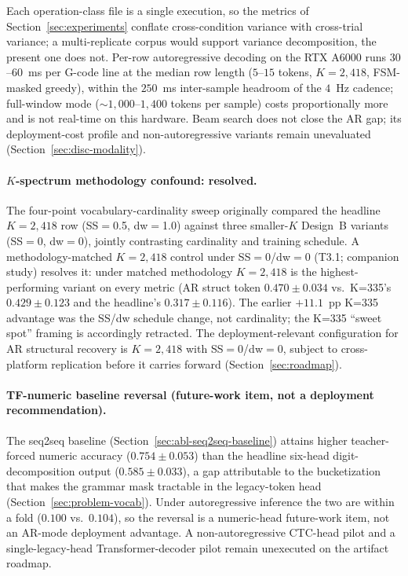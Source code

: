 \documentclass[sensors,article,submit,moreauthors,pdftex]{Definitions/mdpi}
\begin{document}
Each operation-class file is a single execution, so the metrics of Section~\ref{sec:experiments} conflate cross-condition variance with cross-trial variance; a multi-replicate corpus would support variance decomposition, the present one does not. Per-row autoregressive decoding on the RTX A6000 runs $30$--$60$~ms per G-code line at the median row length ($5$--$15$ tokens, $K\!=\!2{,}418$, FSM-masked greedy), within the $250$~ms inter-sample headroom of the $4$~Hz cadence; full-window mode ($\sim$$1{,}000$--$1{,}400$ tokens per sample) costs proportionally more and is not real-time on this hardware. Beam search does not close the AR gap; its deployment-cost profile and non-autoregressive variants remain unevaluated (Section~\ref{sec:disc-modality}).

\paragraph{$K$-spectrum methodology confound: resolved.} The four-point vocabulary-cardinality sweep originally compared the headline $K\!=\!2{,}418$ row (SS$=$0.5, dw$=$1.0) against three smaller-$K$ Design~B variants (SS$=$0, dw$=$0), jointly contrasting cardinality and training schedule. A methodology-matched $K\!=\!2{,}418$ control under SS$=$0/dw$=$0 (T3.1; companion study) resolves it: under matched methodology $K\!=\!2{,}418$ is the highest-performing variant on every metric (AR struct token $0.470 \pm 0.034$ vs.\ K=335's $0.429 \pm 0.123$ and the headline's $0.317 \pm 0.116$). The earlier $+11.1$~pp K=335 advantage was the SS/dw schedule change, not cardinality; the K=335 ``sweet spot'' framing is accordingly retracted. The deployment-relevant configuration for AR structural recovery is $K\!=\!2{,}418$ with SS$=$0/dw$=$0, subject to cross-platform replication before it carries forward (Section~\ref{sec:roadmap}).

\paragraph{TF-numeric baseline reversal (future-work item, not a deployment recommendation).} The seq2seq baseline (Section~\ref{sec:abl-seq2seq-baseline}) attains higher teacher-forced numeric accuracy ($0.754 \pm 0.053$) than the headline six-head digit-decomposition output ($0.585 \pm 0.033$), a gap attributable to the bucketization that makes the grammar mask tractable in the legacy-token head (Section~\ref{sec:problem-vocab}). Under autoregressive inference the two are within a fold ($0.100$ vs.\ $0.104$), so the reversal is a numeric-head future-work item, not an AR-mode deployment advantage. A non-autoregressive CTC-head pilot and a single-legacy-head Transformer-decoder pilot remain unexecuted on the artifact roadmap.
\end{document}
